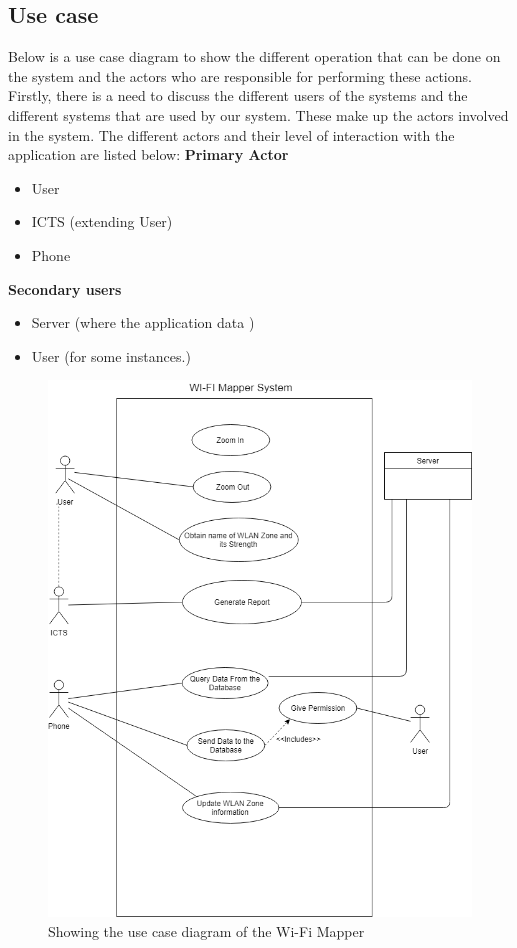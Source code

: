 \subsection*{Use case}
Below is a use case diagram to show the different operation that can be done on the system and the actors who are responsible for performing these actions. Firstly, there is a need to discuss the different users of the systems and the different systems that are used by our system. These make up the actors involved in the system. The different actors and their level of interaction with the application are listed below:
\newline\textbf{Primary Actor}
\begin{itemize}
	\item User
	\item ICTS (extending User)
	\item Phone
\end{itemize}
\textbf{Secondary users}
\begin{itemize}
	\item Server (where the application data )
	\item User (for some instances.)
\end{itemize}
\pagebreak
\begin{figure}
	\centering
	\includegraphics[width=0.7\linewidth]{"images/Use Case"}
	\caption{Showing the use case diagram of the Wi-Fi Mapper}
	\label{fig:use-case}
\end{figure}
